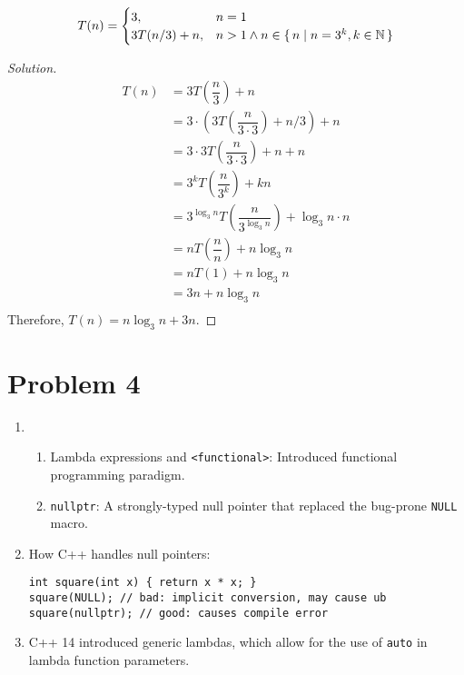 \documentclass[12pt]{article}
\newenvironment{solution}
{\renewcommand\qedsymbol{$\blacksquare$}
\begin{proof}[Solution]}
  {
\end{proof}}
\begin{document}
\[
  T(n) =
  \begin{cases}
    3, & n = 1 \\
    3T(n / 3) + n, & n > 1 \land n \in \set{n \mid n = 3^k, k \in \mathbb N}
  \end{cases}
\]

\begin{solution}
  \begin{align*}
    T(n) & = 3T\left(\dfrac{n}{3}\right) + n \\
    & = 3 \cdot \left(3T\left(\dfrac{n}{3 \cdot 3}\right) + n / 3\right) + n \\
    & = 3 \cdot 3T\left(\dfrac{n}{3 \cdot 3}\right) + n + n \\
    & = 3^kT\left(\dfrac{n}{3^k}\right) + kn \\
    & = 3^{\log_3 n}T\left(\dfrac{n}{3^{\log_3 n}}\right) + \log_3 n \cdot n \\
    & = nT\left(\dfrac{n}{n}\right) + n \log_3 n \\
    & = nT(1) + n \log_3 n \\
    & = 3n + n \log_3 n \\
  \end{align*}
  Therefore, $T(n) = n \log_3 n + 3n$.
\end{solution}

\section*{Problem 4}

\begin{enumerate}[label=(\alph*)]
  \item
    \begin{enumerate}[label=(\roman*)]
      \item Lambda expressions and \verb|<functional>|: Introduced
        functional programming paradigm.
      \item \verb|nullptr|: A strongly-typed null pointer that
        replaced the bug-prone \verb|NULL| macro.
    \end{enumerate}
  \item How C++ handles null pointers:
    \begin{verbatim}
int square(int x) { return x * x; }
square(NULL); // bad: implicit conversion, may cause ub
square(nullptr); // good: causes compile error
    \end{verbatim}
  \item C++ 14 introduced generic lambdas, which allow for the use of
    \verb|auto| in lambda function parameters.
\end{enumerate}
\end{document}
